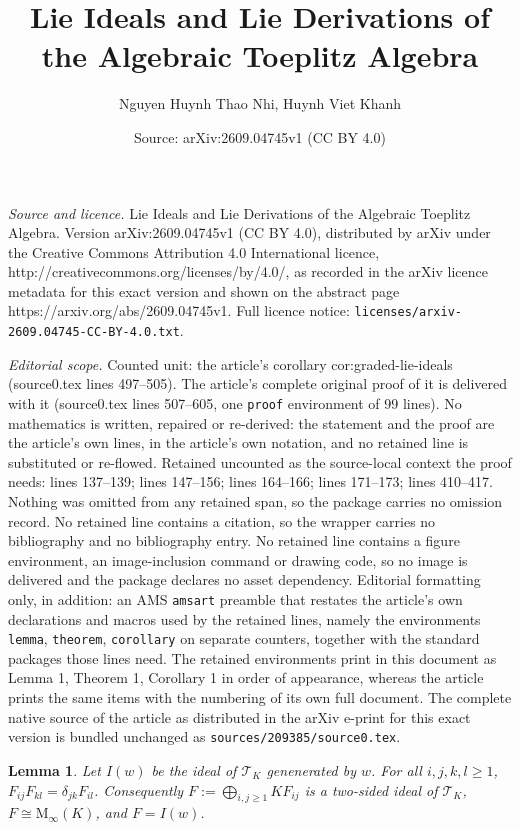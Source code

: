 \documentclass[10pt,a4paper]{amsart}
\title{Lie Ideals and Lie Derivations of the Algebraic Toeplitz Algebra}
\author{Nguyen Huynh Thao Nhi, Huynh Viet Khanh}
\date{Source: arXiv:2609.04745v1 (CC BY 4.0)}
\newtheorem{lemma}{Lemma}
\newcommand{\M}{\mathrm M_\infty(K)}
\newcommand{\T}{\mathscr T_K}
\begin{document}
\maketitle

\noindent\emph{Source and licence.} Lie Ideals and Lie Derivations of the Algebraic Toeplitz Algebra. Version arXiv:2609.04745v1 (CC BY 4.0), distributed by arXiv under the Creative Commons Attribution 4.0 International licence, http://creativecommons.org/licenses/by/4.0/, as recorded in the arXiv licence metadata for this exact version and shown on the abstract page https://arxiv.org/abs/2609.04745v1. Full licence notice: \texttt{licenses/arxiv-2609.04745-CC-BY-4.0.txt}.\par\smallskip

\noindent\textit{Editorial scope.} Counted unit: the article's corollary cor:graded-lie-ideals (source0.tex lines 497--505). The article's complete original proof of it is delivered with it (source0.tex lines 507--605, one \texttt{proof} environment of 99 lines). No mathematics is written, repaired or re-derived: the statement and the proof are the article's own lines, in the article's own notation, and no retained line is substituted or re-flowed.  Retained uncounted as the source-local context the proof needs: lines 137--139; lines 147--156; lines 164--166; lines 171--173; lines 410--417.  Nothing was omitted from any retained span, so the package carries no omission record.  No retained line contains a citation, so the wrapper carries no bibliography and no bibliography entry.  No retained line contains a figure environment, an image-inclusion command or drawing code, so no image is delivered and the package declares no asset dependency.  Editorial formatting only, in addition: an AMS \texttt{amsart} preamble that restates the article's own declarations and macros used by the retained lines, namely the environments \texttt{lemma}, \texttt{theorem}, \texttt{corollary} on separate counters, together with the standard packages those lines need.  The retained environments print in this document as Lemma 1, Theorem 1, Corollary 1 in order of appearance, whereas the article prints the same items with the numbering of its own full document.  The complete native source of the article as distributed in the arXiv e-print for this exact version is bundled unchanged as \texttt{sources/209385/source0.tex}.
\begin{lemma}\label{lem:matrix-units}
Let $I(w)$ be the ideal of $\T$ genenerated by $w$. For all $i,j,k,l\geq1$, $F_{ij}F_{kl}=\delta_{jk}F_{il}$. Consequently $F:=\bigoplus_{i,j\geq1}KF_{ij}$ is a two-sided ideal of $\T$, $F\cong\M$, and $F=I(w)$.
\end{lemma}
\end{document}
